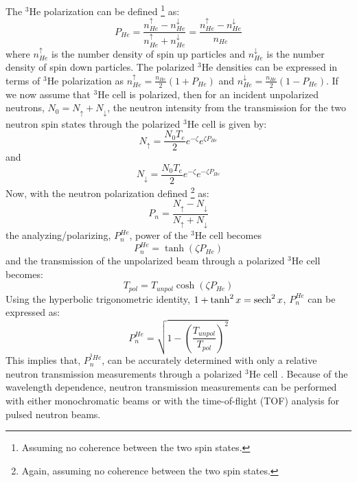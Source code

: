 The $^3$He polarization can be defined \footnote{Assuming no coherence between the two spin states.} as:
\begin{equation}
P_{He} = \frac{n_{He}^{\uparrow} - n_{He}^{\downarrow}}{n_{He}^{\uparrow} + n_{He}^{\downarrow}} =   \frac{n_{He}^{\uparrow} - n_{He}^{\downarrow}}{n_{He}}
\end{equation}
where $n_{He}^{\uparrow}$ is the number density of spin up particles and $n_{He}^{\downarrow}$ is the number density of spin down particles. The polarized $^3$He densities can be expressed in terms of $^3$He polarization as $n_{He}^{\uparrow} = \frac{n_{He}}{2}(1+P_{He})$ and  $n_{He}^{\downarrow}  = \frac{n_{He}}{2}(1-P_{He})$. If we now assume that $^3$He cell is polarized, then for an incident unpolarized neutrons, $N_0 = N_\uparrow + N_\downarrow$, the neutron intensity from the transmission for the two neutron spin states through the polarized $^3$He cell is given by:
\begin{equation}
    N_\uparrow = \frac{N_0 T_e}{2} e^{-\zeta} e^{\zeta P_{He}}
\end{equation}
and
\begin{equation}
   N_\downarrow = \frac{N_0 T_e}{2} e^{-\zeta} e^{-\zeta P_{He}}
\end{equation}
Now, with the neutron polarization defined \footnote{Again, assuming no coherence between the two spin states.} as:
\begin{equation}
    P_n = \frac{N_\uparrow - N_\downarrow}{N_\uparrow + N_\downarrow}
\end{equation}
the analyzing/polarizing, $P_n^{He}$, power of the $^3$He cell becomes
\begin{equation}
    P_n^{He} = \tanh{\left(\zeta P_{He}\right)}
    \label{eq:anal_power}
\end{equation}
and the transmission of the unpolarized beam through a polarized $^3$He cell becomes:
\begin{equation}
       T_{pol} = T_{unpol} \cosh{\left(\zeta P_{He}\right)}
       \label{eq:Tpol}
\end{equation}
Using the hyperbolic trigonometric identity, $1+\tanh^2{x} = \operatorname{sech}^2{x}$, $P_n^{He}$ can be expressed as:
\begin{equation}
    P_n^{He} = \sqrt{1 - \left(\frac{T_{unpol}}{T_{pol}} \right)^2}
    \label{eq:anal_power2}
\end{equation}
This implies that, $P_n^{^3He}$, can be accurately determined with only a relative neutron transmission measurements through a polarized $^3$He cell \cite{Greene1995, Coulter1990, Jones2000}. Because of the wavelength dependence, neutron transmission measurements can be performed with either monochromatic beams or with the time-of-flight (TOF) analysis for pulsed neutron beams.

